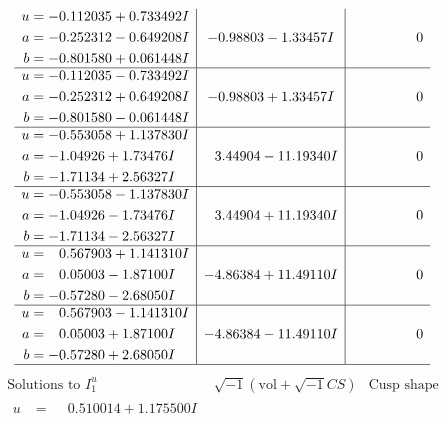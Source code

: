 \documentclass[1p]{elsarticle_modified}
\theoremstyle{definition}
\newcommand{\I}{\sqrt{-1}}
\begin{document}
$$\begin{array}{c|c|c}
\begin{aligned}
u &= -0.112035 + 0.733492 I \\
a &= -0.252312 - 0.649208 I \\
b &= -0.801580 + 0.061448 I\end{aligned}
 & -0.98803 - 1.33457 I & \phantom{-0.000000 } 0 \\ \hline\begin{aligned}
u &= -0.112035 - 0.733492 I \\
a &= -0.252312 + 0.649208 I \\
b &= -0.801580 - 0.061448 I\end{aligned}
 & -0.98803 + 1.33457 I & \phantom{-0.000000 } 0 \\ \hline\begin{aligned}
u &= -0.553058 + 1.137830 I \\
a &= -1.04926 + 1.73476 I \\
b &= -1.71134 + 2.56327 I\end{aligned}
 & \phantom{-}3.44904 - 11.19340 I & \phantom{-0.000000 } 0 \\ \hline\begin{aligned}
u &= -0.553058 - 1.137830 I \\
a &= -1.04926 - 1.73476 I \\
b &= -1.71134 - 2.56327 I\end{aligned}
 & \phantom{-}3.44904 + 11.19340 I & \phantom{-0.000000 } 0 \\ \hline\begin{aligned}
u &= \phantom{-}0.567903 + 1.141310 I \\
a &= \phantom{-}0.05003 - 1.87100 I \\
b &= -0.57280 - 2.68050 I\end{aligned}
 & -4.86384 + 11.49110 I & \phantom{-0.000000 } 0 \\ \hline\begin{aligned}
u &= \phantom{-}0.567903 - 1.141310 I \\
a &= \phantom{-}0.05003 + 1.87100 I \\
b &= -0.57280 + 2.68050 I\end{aligned}
 & -4.86384 - 11.49110 I & \phantom{-0.000000 } 0\\
 \hline 
 \end{array}$$\newpage$$\begin{array}{c|c|c}  
\text{Solutions to }I^u_{1}& \I (\text{vol} + \sqrt{-1}CS) & \text{Cusp shape}\\
 \hline 
\begin{aligned}
u &= \phantom{-}0.510014 + 1.175500 I \\

\end{aligned}
\end{array}$$
\end{document}
